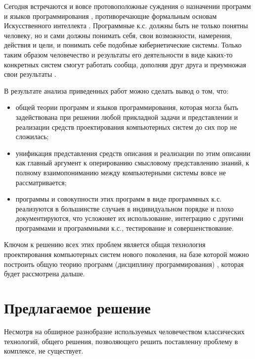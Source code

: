 Сегодня встречаются и вовсе протовоположные суждения о назначении программ и языков программирования \cite{Rapaport2020}, противоречающие формальным основам Искусственного интеллекта \cite{Grimmelmann2022}. Программные к.с. должны быть не только понятны человеку, но и сами должны понимать себя, свои возможности, намерения, действия и цели, и понимать себе подобные кибернетические системы. Только таким образом человечество и результаты его деятельности в виде каких-то конкретных систем смогут работать сообща, дополняя друг друга и преумножая свои результаты \cite{Golenkov2012}.

В результате анализа приведенных работ можно сделать вывод о том, что:
\begin{itemize}
    \item общей теории программ и языков программирования, которая могла быть задействована при решении любой прикладной задачи и представлении и реализации средств проектирования компьютерных систем до сих пор не сложилась;
    \item унификация представления средств описания и реализации по этим описании как главный аргумент к оперированию смысловому представлению знаний, к полному взаимопониманию между компьютерными системы вовсе не рассматривается;
    \item программы и совокупности этих программ в виде программных к.с. реализуются в большинстве случаев в индивидуальном порядке и плохо документируются, что усложняет их использование, интеграцию с другими программами и программными к.с., тестирование и совершенствование.
\end{itemize}

Ключом к решению всех этих проблем является общая технология проектирования компьютерных систем нового поколения, на базе которой можно построить общую теорию программ (дисциплину программирования) \cite{Deikstra1978}, которая будет рассмотрена дальше.

\section{Предлагаемое решение}

Несмотря на обширное разнобразие используемых человечеством классических технологий, общего решения, позволяющего решить поставленну проблему в комплексе, не существует.

